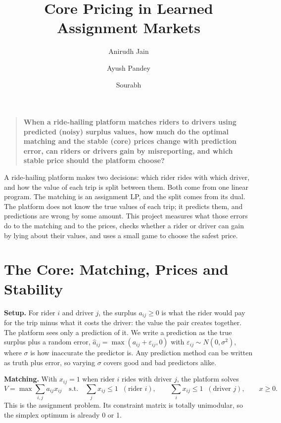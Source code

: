 \documentclass[11pt,a4paper]{article}
\title{\textbf{Core Pricing in Learned Assignment Markets}}
\author{Anirudh Jain \and Ayush Pandey \and Sourabh}
\date{}
\begin{document}
\vspace{-2em}
\maketitle
\vspace{-1.5em}

\begin{quote}
\textbf{When a ride-hailing platform matches riders to drivers using predicted (noisy) surplus values, how much do the optimal matching and the stable (core) prices change with prediction error, can riders or drivers gain by misreporting, and which stable price should the platform choose?}
\end{quote}

A ride-hailing platform makes two decisions: which rider rides with which driver, and how the value of each trip is split between them. Both come from one linear program. The matching is an assignment LP, and the split comes from its dual. The platform does not know the true values of each trip; it predicts them, and predictions are wrong by some amount. This project measures what those errors do to the matching and to the prices, checks whether a rider or driver can gain by lying about their values, and uses a small game to choose the safest price.

\section{The Core: Matching, Prices and Stability}

\textbf{Setup.} For rider $i$ and driver $j$, the surplus $a_{ij}\ge0$ is what the rider would pay for the trip minus what it costs the driver: the value the pair creates together. The platform sees only a prediction of it. We write a prediction as the true surplus plus a random error, $\hat a_{ij}=\max(a_{ij}+\varepsilon_{ij},0)$ with $\varepsilon_{ij}\sim N(0,\sigma^2)$, where $\sigma$ is how inaccurate the predictor is. Any prediction method can be written as truth plus error, so varying $\sigma$ covers good and bad predictors alike.

\textbf{Matching.} With $x_{ij}=1$ when rider $i$ rides with driver $j$, the platform solves
\[
V=\max \sum_{i,j} a_{ij}x_{ij}
\quad\text{s.t.}\quad
\sum_j x_{ij}\le 1\;\;(\text{rider } i),\qquad \sum_i x_{ij}\le 1\;\;(\text{driver } j),\qquad x\ge 0 .
\]
This is the assignment problem. Its constraint matrix is totally unimodular, so the simplex optimum is already 0 or 1.
\end{document}
